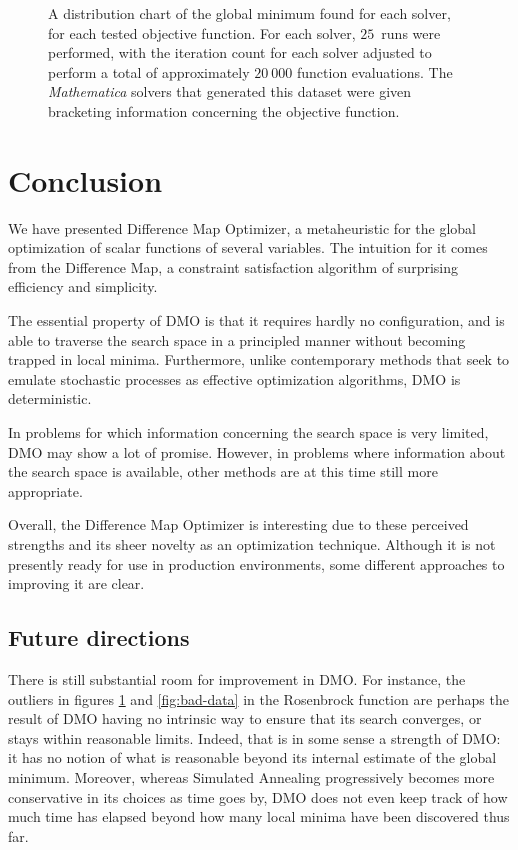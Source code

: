 \documentclass[12pt]{article}
\begin{document}
\begin{figure}[H]
\begin{center}
        \caption{
            A distribution chart of the global minimum found for each
            solver, for each tested objective function. For each solver,
            $25$~runs were performed, with the iteration count for each
            solver adjusted to perform a total of approximately $20~000$
            function evaluations. The \emph{Mathematica} solvers that
            generated this dataset were given bracketing information
            concerning the objective function.
        }
        \label{fig:good-data}
    \end{center}
\end{figure}

\pagebreak

\section{Conclusion}

We have presented Difference Map Optimizer, a metaheuristic for the global
optimization of scalar functions of several variables.
The intuition for it comes from the Difference Map, a constraint satisfaction
algorithm of surprising efficiency and simplicity.

The essential property of DMO is that it requires hardly no configuration, and
is able to traverse the search space in a principled manner without becoming
trapped in local minima.
Furthermore, unlike contemporary methods that seek to emulate stochastic
processes as effective optimization algorithms, DMO is deterministic.

In problems for which information concerning the search space is very limited,
DMO may show a lot of promise.
However, in problems where information about the search space is available,
other methods are at this time still more appropriate.

Overall, the Difference Map Optimizer is interesting due to these perceived
strengths and its sheer novelty as an optimization technique. Although it is
not presently ready for use in production environments, some different
approaches to improving it are clear.


\subsection{Future directions}

There is still substantial room for improvement in DMO.
For instance, the outliers in figures \ref{fig:good-data} and
\ref{fig:bad-data} in the Rosenbrock function are perhaps the result of DMO
having no intrinsic way to ensure that its search converges, or stays within
reasonable limits.
Indeed, that is in some sense a strength of DMO: it has no notion of what is
reasonable beyond its internal estimate of the global minimum.
Moreover, whereas Simulated Annealing progressively becomes more
conservative in its choices as time goes by, DMO does not even keep track of
how much time has elapsed beyond how many local minima have been discovered
thus far.
\end{document}
